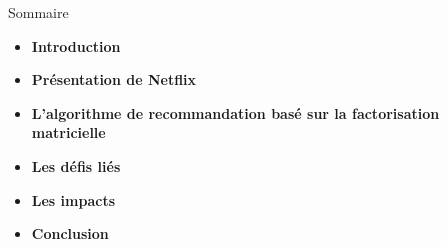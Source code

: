 \begin{frame}{Sommaire}
    \begin{itemize}
        \item \textbf{Introduction}
        \item \textbf{Présentation de Netflix}
        \item \textbf{L'algorithme de recommandation basé sur la factorisation matricielle}
        \item \textbf{Les défis liés}
        \item \textbf{Les impacts}
        \item \textbf{Conclusion}
    \end{itemize}
\end{frame}